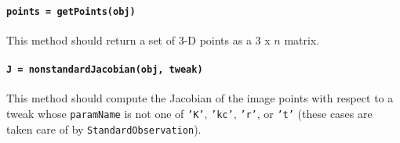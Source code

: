 \paragraph{\texttt{points = getPoints(obj)}}

This method should return a set of 3-D points as a 3 x $n$ matrix.

\paragraph{\texttt{J = nonstandardJacobian(obj, tweak)}}

This method should compute the Jacobian of the image points with respect to a tweak
whose \texttt{paramName} is not one of \texttt{'K'}, \texttt{'kc'}, \texttt{'r'}, or \texttt{'t'}
(these cases are taken care of by \texttt{StandardObservation}).
